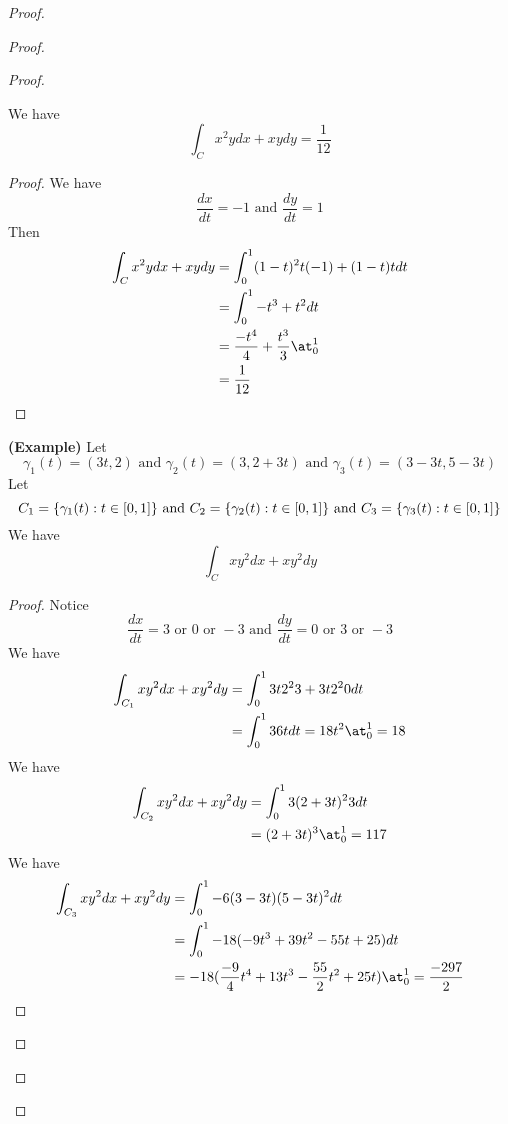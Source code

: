 \documentclass{report}
\begin{document}
\begin{proof}
\begin{proof}
\begin{proof}
\begin{theorem}
We have
\begin{equation}
\int_C x^2ydx+xydy=\frac{1}{12}
\end{equation}
\end{theorem}
\begin{proof}
We have
\begin{equation}
\frac{dx}{dt}=-1\text{ and }\frac{dy}{dt}=1
\end{equation}
Then
\begin{align}
\int_C x^2ydx+xydy&=\int_0^1 (1-t)^2t(-1)+(1-t)tdt\\
&=\int_0^1 -t^3+t^2dt\\
&=\frac{-t^4}{4}+\frac{t^3}{3}\at_{0}^1\\
&=\frac{1}{12}
\end{align}
\end{proof}
\begin{theorem}
\label{7.2.7}
\textbf{(Example)} Let
\begin{equation}
\gamma_1 (t)=(3t,2)\text{ and }\gamma _2(t)=(3,2+3t)\text{ and }\gamma _3(t)=(3-3t,5-3t)
\end{equation}
Let
 \begin{equation}
C_1=\{ \gamma _1(t):t\in[0,1] \}\text{ and }C_2=\{ \gamma _2(t):t\in[0,1] \}\text{ and }C_3=\{ \gamma _3(t):t\in[0,1] \}
\end{equation}
We have
\begin{equation}
\int_C xy^2 dx+xy^2 dy 
\end{equation}
\end{theorem}
\begin{proof}
 Notice 
 \begin{equation}
 \frac{dx}{dt}=3\text{ or }0\text{ or }-3\text{ and }\frac{dy}{dt}=0\text{ or }3\text{ or }-3
 \end{equation}
We have
\begin{align}
\int_{C_1} xy^2 dx+xy^2dy&=\int_0^1 3t 2^2 3+3t 2^2 0 dt\\
&=\int_0^1 36t dt=18t^2 \at_{0}^1=18
\end{align}
We have
\begin{align}
\int_{C_2} xy^2dx+xy^2dy &=\int_0^1 3(2+3t)^2 3dt\\
&=(2+3t)^3 \at_{0}^1=117
\end{align}
We have
\begin{align}
\int_{C_3}xy^2 dx+xy^2dy&=\int_0^1 -6(3-3t)(5-3t)^2 dt\\
&=\int_0^1 -18(-9t^3+39t^2-55t+25)dt\\
&=-18 (\frac{-9}{4}t^4+13t^3-\frac{55}{2}t^2+25t) \at_{0}^1 =\frac{-297}{2}

\end{align}
\end{proof}
\end{proof}
\end{proof}
\end{proof}
\end{document}
